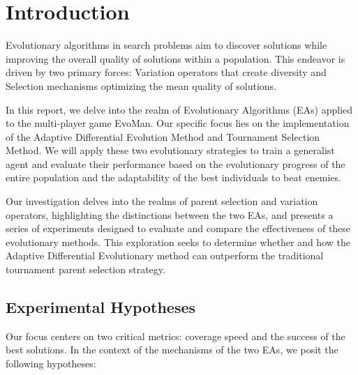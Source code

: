 
\section{Introduction}


Evolutionary algorithms in search problems aim to discover solutions while improving the overall quality of solutions within a population. This endeavor is driven by two primary forces: Variation operators that create diversity and Selection mechanisms optimizing the mean quality of solutions.

In this report, we delve into the realm of Evolutionary Algorithms (EAs) applied to the multi-player game EvoMan. Our specific focus lies on the implementation of the Adaptive Differential Evolution Method and Tournament Selection Method. We will apply these two evolutionary strategies to train a generalist agent and evaluate their performance based on the evolutionary progress of the entire population and the adaptability of the best individuals to beat enemies.

Our investigation delves into the realms of parent selection and variation operators, highlighting the distinctions between the two EAs, and presents a series of experiments designed to evaluate and compare the effectiveness of these evolutionary methods. This exploration seeks to determine whether and how the Adaptive Differential Evolutionary method can outperform the traditional tournament parent selection strategy.

\subsection{Experimental Hypotheses}
Our focus centers on two critical metrics: coverage speed and the success of the best solutions. In the context of the mechanisms of the two EAs, we posit the following hypotheses:

